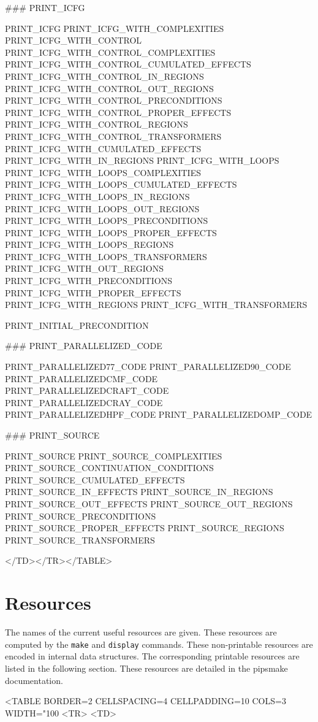 \documentclass[a4paper,12pt]{article}
\begin{document}
{\begin{verbatim*}
### PRINT_ICFG

PRINT_ICFG
PRINT_ICFG_WITH_COMPLEXITIES
PRINT_ICFG_WITH_CONTROL
PRINT_ICFG_WITH_CONTROL_COMPLEXITIES
PRINT_ICFG_WITH_CONTROL_CUMULATED_EFFECTS
PRINT_ICFG_WITH_CONTROL_IN_REGIONS
PRINT_ICFG_WITH_CONTROL_OUT_REGIONS
PRINT_ICFG_WITH_CONTROL_PRECONDITIONS
PRINT_ICFG_WITH_CONTROL_PROPER_EFFECTS
PRINT_ICFG_WITH_CONTROL_REGIONS
PRINT_ICFG_WITH_CONTROL_TRANSFORMERS
PRINT_ICFG_WITH_CUMULATED_EFFECTS
PRINT_ICFG_WITH_IN_REGIONS
PRINT_ICFG_WITH_LOOPS
PRINT_ICFG_WITH_LOOPS_COMPLEXITIES
PRINT_ICFG_WITH_LOOPS_CUMULATED_EFFECTS
PRINT_ICFG_WITH_LOOPS_IN_REGIONS
PRINT_ICFG_WITH_LOOPS_OUT_REGIONS
PRINT_ICFG_WITH_LOOPS_PRECONDITIONS
PRINT_ICFG_WITH_LOOPS_PROPER_EFFECTS
PRINT_ICFG_WITH_LOOPS_REGIONS
PRINT_ICFG_WITH_LOOPS_TRANSFORMERS
PRINT_ICFG_WITH_OUT_REGIONS
PRINT_ICFG_WITH_PRECONDITIONS
PRINT_ICFG_WITH_PROPER_EFFECTS
PRINT_ICFG_WITH_REGIONS
PRINT_ICFG_WITH_TRANSFORMERS

PRINT_INITIAL_PRECONDITION

### PRINT_PARALLELIZED_CODE

PRINT_PARALLELIZED77_CODE
PRINT_PARALLELIZED90_CODE
PRINT_PARALLELIZEDCMF_CODE
PRINT_PARALLELIZEDCRAFT_CODE
PRINT_PARALLELIZEDCRAY_CODE
PRINT_PARALLELIZEDHPF_CODE
PRINT_PARALLELIZEDOMP_CODE

### PRINT_SOURCE

PRINT_SOURCE
PRINT_SOURCE_COMPLEXITIES
PRINT_SOURCE_CONTINUATION_CONDITIONS
PRINT_SOURCE_CUMULATED_EFFECTS
PRINT_SOURCE_IN_EFFECTS
PRINT_SOURCE_IN_REGIONS
PRINT_SOURCE_OUT_EFFECTS
PRINT_SOURCE_OUT_REGIONS
PRINT_SOURCE_PRECONDITIONS
PRINT_SOURCE_PROPER_EFFECTS
PRINT_SOURCE_REGIONS
PRINT_SOURCE_TRANSFORMERS
\end{verbatim*}
\begin{rawhtml}
</TD></TR></TABLE>
\end{rawhtml}

\section{Resources}
\label{res}
The names of the current useful resources are given. These resources are
computed by the \verb+make+ and \verb+display+ commands. These
non-printable resources are encoded in internal data structures. The
corresponding printable resources are listed in the following section.
These resources are detailed in the pipsmake documentation.

\begin{rawhtml}
<TABLE BORDER=2 CELLSPACING=4 CELLPADDING=10 COLS=3 WIDTH="100%
<TR>
<TD>
\end{rawhtml}
{\bf \begin{verbatim}


\end{verbatim}}}
\end{document}
